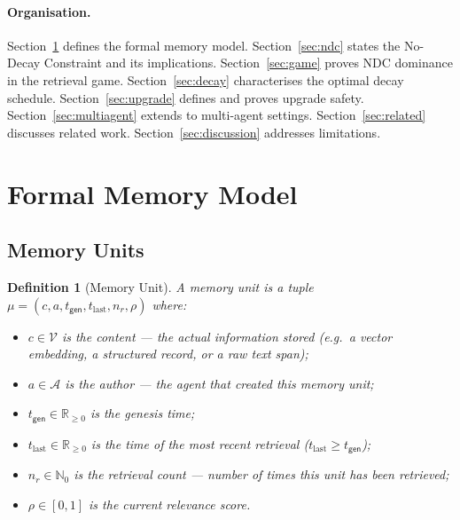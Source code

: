 \documentclass[12pt]{article}
\newtheorem{definition}[theorem]{Definition}
\newcommand{\GEN}{\mathsf{gen}}
\begin{document}
\paragraph{Organisation.}
Section~\ref{sec:model} defines the formal memory model.
Section~\ref{sec:ndc} states the No-Decay Constraint and its implications.
Section~\ref{sec:game} proves NDC dominance in the retrieval game.
Section~\ref{sec:decay} characterises the optimal decay schedule.
Section~\ref{sec:upgrade} defines and proves upgrade safety.
Section~\ref{sec:multiagent} extends to multi-agent settings.
Section~\ref{sec:related} discusses related work.
Section~\ref{sec:discussion} addresses limitations.

\section{Formal Memory Model}
\label{sec:model}

\subsection{Memory Units}

\begin{definition}[Memory Unit]
  A \emph{memory unit} is a tuple
  $\mu = (c, a, t_\GEN, t_\text{last}, n_r, \rho)$ where:
  \begin{itemize}[leftmargin=*]
    \item $c \in \mathcal{V}$ is the \emph{content} — the actual information
      stored (e.g.\ a vector embedding, a structured record, or a raw text span);
    \item $a \in \mathcal{A}$ is the \emph{author} — the agent that created this
      memory unit;
    \item $t_\GEN \in \mathbb{R}_{\ge 0}$ is the \emph{genesis time};
    \item $t_\text{last} \in \mathbb{R}_{\ge 0}$ is the time of the most recent
      retrieval ($t_\text{last} \ge t_\GEN$);
    \item $n_r \in \mathbb{N}_0$ is the \emph{retrieval count} — number of times
      this unit has been retrieved;
    \item $\rho \in [0, 1]$ is the \emph{current relevance score}.
  \end{itemize}
\end{definition}
\end{document}
